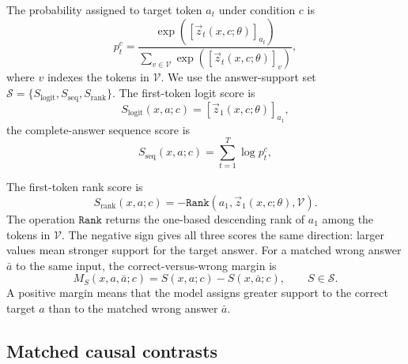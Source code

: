 The probability assigned to target token $a_t$ under condition $c$ is
\begin{equation}
    p_t^{c}
    =\frac{\exp\!\left([\vec{z}_{t}(x,c;\theta)]_{a_t}\right)}
           {\sum_{v\in\mathcal{V}}\exp\!\left([\vec{z}_{t}(x,c;\theta)]_{v}\right)},
    \label{eq:target-token-probability}
\end{equation}
where $v$ indexes the tokens in $\mathcal{V}$. We use the answer-support set $\mathcal{S}=\{S_{\mathrm{logit}},S_{\mathrm{seq}},S_{\mathrm{rank}}\}$. The first-token logit score is
\begin{equation}
    S_{\mathrm{logit}}(x,a;c)
    =[\vec{z}_{1}(x,c;\theta)]_{a_1},
    \label{eq:logit-score}
\end{equation}
the complete-answer sequence score is
\begin{equation}
    S_{\mathrm{seq}}(x,a;c)
    =\sum_{t=1}^{T}\log p_t^{c},
    \label{eq:app-sequence-score}
\end{equation}
\begin{samepage}
The first-token rank score is
\begin{equation}
    S_{\mathrm{rank}}(x,a;c)
    =-\mathtt{Rank}\!\left(a_1,\vec{z}_{1}(x,c;\theta),\mathcal{V}\right).
    \label{eq:rank-score}
\end{equation}
The operation $\mathtt{Rank}$ returns the one-based descending rank of $a_1$ among the tokens in $\mathcal{V}$. The negative sign gives all three scores the same direction: larger values mean stronger support for the target answer. For a matched wrong answer $\bar{a}$ to the same input, the correct-versus-wrong margin is
\begin{equation}
    M_S(x,a,\bar{a};c)
    =S(x,a;c)-S(x,\bar{a};c),
    \qquad S\in\mathcal{S}.
    \label{eq:answer-margin}
\end{equation}
A positive margin means that the model assigns greater support to the correct target $a$ than to the matched wrong answer $\bar{a}$.
\end{samepage}

\subsection{Matched causal contrasts}


